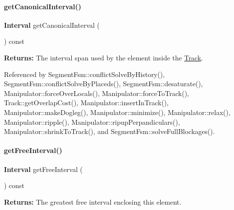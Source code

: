 \mbox{\label{classKite_1_1TrackElement_ae96c050b96eaea51a3821cc01a1f3334}} 
\paragraph{\texorpdfstring{get\+Canonical\+Interval()}{getCanonicalInterval()}}
{\footnotesize\ttfamily \textbf{ Interval} get\+Canonical\+Interval (\begin{DoxyParamCaption}{ }\end{DoxyParamCaption}) const\hspace{0.3cm}{\ttfamily [inline]}}

{\bfseries Returns\+:} The interval span used by the element inside the \hyperlink{classKite_1_1Track}{Track}. 

Referenced by Segment\+Fsm\+::conflict\+Solve\+By\+History(), Segment\+Fsm\+::conflict\+Solve\+By\+Placeds(), Segment\+Fsm\+::desaturate(), Manipulator\+::force\+Over\+Locals(), Manipulator\+::force\+To\+Track(), Track\+::get\+Overlap\+Cost(), Manipulator\+::insert\+In\+Track(), Manipulator\+::make\+Dogleg(), Manipulator\+::minimize(), Manipulator\+::relax(), Manipulator\+::ripple(), Manipulator\+::ripup\+Perpandiculars(), Manipulator\+::shrink\+To\+Track(), and Segment\+Fsm\+::solve\+Full\+Blockages().

\mbox{\label{classKite_1_1TrackElement_a034711e2d3617ea848ef9f5a18255e10}} 
\paragraph{\texorpdfstring{get\+Free\+Interval()}{getFreeInterval()}}
{\footnotesize\ttfamily \textbf{ Interval} get\+Free\+Interval (\begin{DoxyParamCaption}{ }\end{DoxyParamCaption}) const\hspace{0.3cm}{\ttfamily [virtual]}}

{\bfseries Returns\+:} The greatest free interval enclosing this element. 

